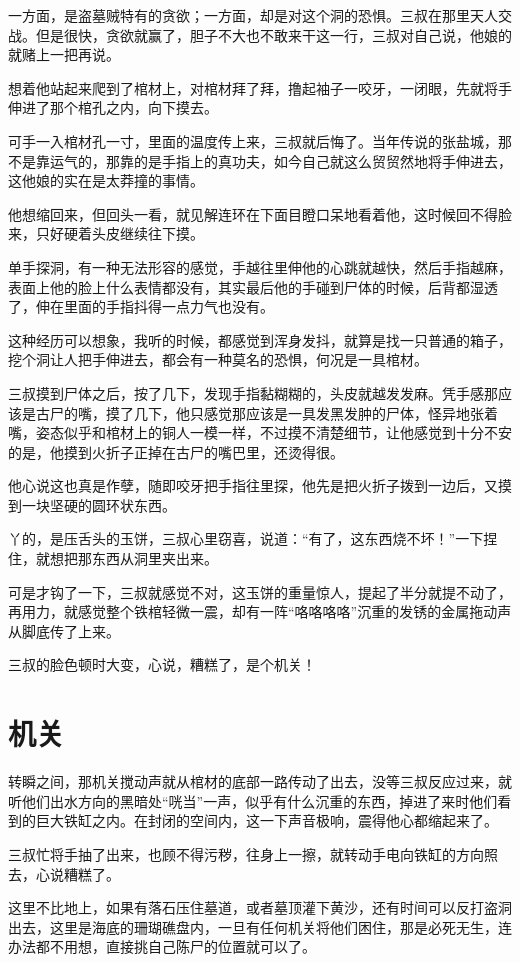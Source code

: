 一方面，是盗墓贼特有的贪欲；一方面，却是对这个洞的恐惧。三叔在那里天人交战。但是很快，贪欲就赢了，胆子不大也不敢来干这一行，三叔对自己说，他娘的就赌上一把再说。

想着他站起来爬到了棺材上，对棺材拜了拜，撸起袖子一咬牙，一闭眼，先就将手伸进了那个棺孔之内，向下摸去。

可手一入棺材孔一寸，里面的温度传上来，三叔就后悔了。当年传说的张盐城，那不是靠运气的，那靠的是手指上的真功夫，如今自己就这么贸贸然地将手伸进去，这他娘的实在是太莽撞的事情。

他想缩回来，但回头一看，就见解连环在下面目瞪口呆地看着他，这时候回不得脸来，只好硬着头皮继续往下摸。

单手探洞，有一种无法形容的感觉，手越往里伸他的心跳就越快，然后手指越麻，表面上他的脸上什么表情都没有，其实最后他的手碰到尸体的时候，后背都湿透了，伸在里面的手指抖得一点力气也没有。

这种经历可以想象，我听的时候，都感觉到浑身发抖，就算是找一只普通的箱子，挖个洞让人把手伸进去，都会有一种莫名的恐惧，何况是一具棺材。

三叔摸到尸体之后，按了几下，发现手指黏糊糊的，头皮就越发发麻。凭手感那应该是古尸的嘴，摸了几下，他只感觉那应该是一具发黑发肿的尸体，怪异地张着嘴，姿态似乎和棺材上的铜人一模一样，不过摸不清楚细节，让他感觉到十分不安的是，他摸到火折子正掉在古尸的嘴巴里，还烫得很。

他心说这也真是作孽，随即咬牙把手指往里探，他先是把火折子拨到一边后，又摸到一块坚硬的圆环状东西。

丫的，是压舌头的玉饼，三叔心里窃喜，说道：“有了，这东西烧不坏！”一下捏住，就想把那东西从洞里夹出来。

可是才钩了一下，三叔就感觉不对，这玉饼的重量惊人，提起了半分就提不动了，再用力，就感觉整个铁棺轻微一震，却有一阵“咯咯咯咯”沉重的发锈的金属拖动声从脚底传了上来。

三叔的脸色顿时大变，心说，糟糕了，是个机关！

\chapter{机关}

转瞬之间，那机关搅动声就从棺材的底部一路传动了出去，没等三叔反应过来，就听他们出水方向的黑暗处“咣当”一声，似乎有什么沉重的东西，掉进了来时他们看到的巨大铁缸之内。在封闭的空间内，这一下声音极响，震得他心都缩起来了。

三叔忙将手抽了出来，也顾不得污秽，往身上一擦，就转动手电向铁缸的方向照去，心说糟糕了。

这里不比地上，如果有落石压住墓道，或者墓顶灌下黄沙，还有时间可以反打盗洞出去，这里是海底的珊瑚礁盘内，一旦有任何机关将他们困住，那是必死无生，连办法都不用想，直接挑自己陈尸的位置就可以了。

